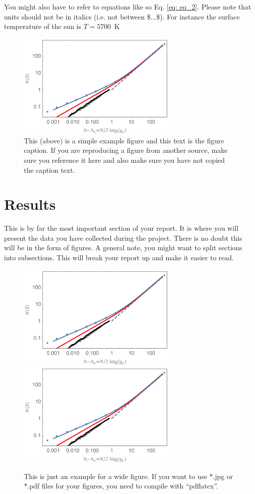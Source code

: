 \documentclass[a4paper,twocolumn,12pt, notitlepage]{article}
\begin{document}
You might also have to refer to equations like so Eq. \eqref{eq: eq_2}. Please note that units should not be in italics (i.e. not between \$...\$). For instance the surface temperature of the sun is $T = 5700$~K

\begin{figure}[t]
\centering
\includegraphics[width=77mm]{pngexample.png}
\caption{\small This (above) is a simple example figure and this text is the figure caption. If you are reproducing a figure from another source, make sure you reference it here and also make sure you have not copied the caption text.}
\label{fig: fig_1}
\end{figure}

\section{Results}
This is by far the most important section of your report. It is where you will present the data you have collected during the project. There is no doubt this will be in the form of figures. A general note, you might want to split sections into subsections. This will break your report up and make it easier to read.

\begin{figure}[]
\centering
\includegraphics[width=77mm]{pngexample.png} \hspace{3mm}
\includegraphics[width=77mm]{pngexample.png}
\caption{\small This is just an example for a wide figure.
                If you want to use *.jpg or *.pdf files
                for your figures, you need to compile with
                ``pdflatex''.}
\label{fig: fig_2}
\end{figure}
\end{document}
